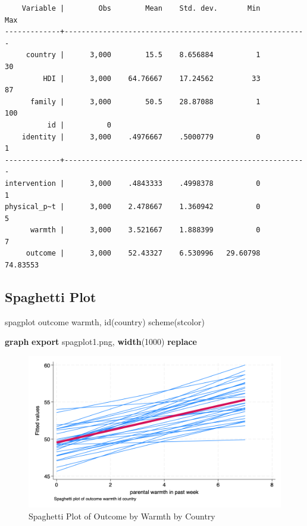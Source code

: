 \documentclass[
  letterpaper,
  DIV=11,
  numbers=noendperiod]{scrreprt}
\newenvironment{Shaded}{\begin{snugshade}}{\end{snugshade}}
\newcommand{\DecValTok}[1]{\textcolor[rgb]{0.68,0.00,0.00}{#1}}
\newcommand{\KeywordTok}[1]{\textcolor[rgb]{0.00,0.23,0.31}{\textbf{#1}}}
\newcommand{\NormalTok}[1]{\textcolor[rgb]{0.00,0.23,0.31}{#1}}
\begin{document}
\begin{verbatim}
    Variable |        Obs        Mean    Std. dev.       Min        Max
-------------+---------------------------------------------------------
     country |      3,000        15.5    8.656884          1         30
         HDI |      3,000    64.76667    17.24562         33         87
      family |      3,000        50.5    28.87088          1        100
          id |          0
    identity |      3,000    .4976667    .5000779          0          1
-------------+---------------------------------------------------------
intervention |      3,000    .4843333    .4998378          0          1
physical_p~t |      3,000    2.478667    1.360942          0          5
      warmth |      3,000    3.521667    1.888399          0          7
     outcome |      3,000    52.43327    6.530996   29.60798   74.83553
\end{verbatim}

\subsection{Spaghetti Plot}\label{spaghetti-plot}

\begin{Shaded}
\begin{Highlighting}[]
\NormalTok{spagplot outcome warmth, id(country) }\DecValTok{scheme}\NormalTok{(stcolor)}

\KeywordTok{graph} \KeywordTok{export}\NormalTok{ spagplot1.png, }\KeywordTok{width}\NormalTok{(1000) }\KeywordTok{replace}
\end{Highlighting}
\end{Shaded}

\begin{figure}[H]

{\centering \includegraphics[width=0.5\linewidth,height=\textheight,keepaspectratio]{spagplot1.png}

}

\caption{Spaghetti Plot of Outcome by Warmth by Country}

\end{figure}%
\end{document}
